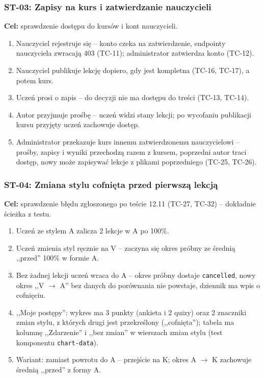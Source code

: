 \subsubsection{ST-03: Zapisy na kurs i zatwierdzanie nauczycieli}
\textbf{Cel:} sprawdzenie dostępu do kursów i kont nauczycieli.
\begin{enumerate}[leftmargin=*]
    \item Nauczyciel rejestruje się -- konto czeka na zatwierdzenie, endpointy nauczyciela zwracają 403 (TC-11); administrator zatwierdza konto (TC-12).
    \item Nauczyciel publikuje lekcję dopiero, gdy jest kompletna (TC-16, TC-17), a potem kurs.
    \item Uczeń prosi o zapis -- do decyzji nie ma dostępu do treści (TC-13, TC-14).
    \item Autor przyjmuje prośbę -- uczeń widzi stany lekcji; po wycofaniu publikacji kursu przyjęty uczeń zachowuje dostęp.
    \item Administrator przekazuje kurs innemu zatwierdzonemu nauczycielowi -- prośby, zapisy i wyniki przechodzą razem z kursem, poprzedni autor traci dostęp, nowy może zapisywać lekcje z plikami poprzedniego (TC-25, TC-26).
\end{enumerate}

\subsubsection{ST-04: Zmiana stylu cofnięta przed pierwszą lekcją}
\textbf{Cel:} sprawdzenie błędu zgłoszonego po teście 12.11 (TC-27, TC-32) -- dokładnie ścieżka z testu.
\begin{enumerate}[leftmargin=*]
    \item Uczeń ze stylem A zalicza 2 lekcje w A po 100\%.
    \item Uczeń zmienia styl ręcznie na V -- zaczyna się okres próbny ze średnią ,,przed'' 100\% w formie A.
    \item Bez żadnej lekcji uczeń wraca do A -- okres próbny dostaje \texttt{cancelled}, nowy okres ,,V $\to$ A'' bez danych do porównania nie powstaje, dziennik ma wpis o cofnięciu.
    \item ,,Moje postępy'': wykres ma 3 punkty (ankieta i 2 quizy) oraz 2 znaczniki zmian stylu, z których drugi jest przekreślony (,,cofnięta''); tabela ma kolumnę ,,Zdarzenie'' i ,,bez zmian'' w wierszach zmian stylu (test komponentu \texttt{chart-data}).
    \item Wariant: zamiast powrotu do A -- przejście na K; okres A $\to$ K zachowuje średnią ,,przed'' z formy A.
\end{enumerate}

